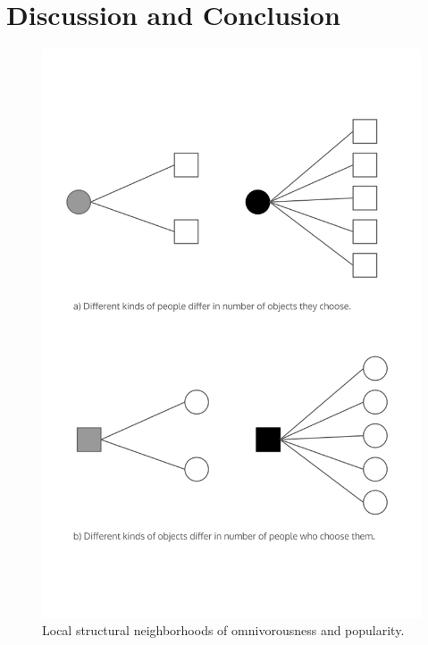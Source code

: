 \documentclass[preprint,12pt,authoryear]{elsarticle}
\begin{document}
\section{Discussion and Conclusion}
\label{sec:disc}






\newpage
 







\begin{figure}
    \centering
    \includegraphics[width=0.8\linewidth]{Figs/local-struct1.png}
    \caption{Local structural neighborhoods of omnivorousness and popularity.}
    \label{fig:local-struct1}
\end{figure}
\end{document}
